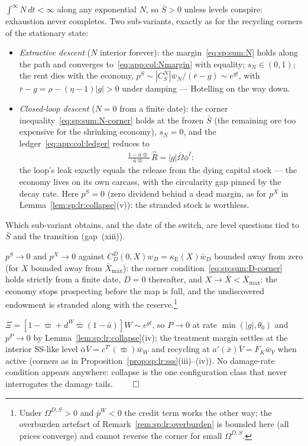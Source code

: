  $\int^\infty N\,dt<\infty$ along any exponential $N$, so
$\bar S>0$ unless levels conspire: exhaustion never completes. Two sub-variants, exactly as
for the recycling corners of the stationary state:
\begin{itemize}
    \item \emph{Extractive descent} ($N$ interior forever): the
    margin~\eqref{eq:sp:sum:N} holds along the path and converges
    to~\eqref{eq:app:col:Nmargin} with equality; $s_N\in\left(0,1\right)$; the rent dies with
    the economy, $p^S\sim\left|C^N_S\right|\bar w_N/\left(\bar r-g\right)\sim e^{gt}$, with
    $\bar r-g=\rho-\left(\eta-1\right)\left|g\right|>0$ under damping --- Hotelling on the way
    down.
    \item \emph{Closed-loop descent} ($N=0$ from a finite date): the corner
    inequality~\eqref{eq:sp:sum:N-corner} holds at the frozen $\bar S$ (the remaining ore too
    expensive for the shrinking economy), $s_N=0$, and the
    ledger~\eqref{eq:app:col:ledger} reduces to
    \begin{align}
    \frac{1-\bar a\bar\varpi}{\bar a\bar\varpi}\,\hat R=\left|g\right|\bar\Omega\phi^I :
    \label{eq:app:col:closedloop}
    \end{align}
    the loop's leak exactly equals the release from the dying capital stock --- the economy
    lives on its own carcass, with the circularity gap pinned by the decay rate. Here
    $p^S=0$ (zero dividend behind a dead margin, as for $p^X$ in
    Lemma~\ref{lem:sp:lr:collapse}(v)): the stranded stock is worthless.
\end{itemize}
Which sub-variant obtains, and the date of the switch, are level questions tied to $\bar S$
and the transition (gap~(xiii)).

 $p^S\to0$ and $p^X\to0$ against
$C^D_D\left(0,X\right)w_D=\kappa_{\mathrm E}\!\left(X\right)\bar w_D$ bounded away from zero
(for $X$ bounded away from $\bar X_{\max}$): the corner
condition~\eqref{eq:sp:sum:D-corner} holds strictly from a finite date, $D=0$ thereafter, and
$X\to\bar X<\bar X_{\max}$: the economy stops prospecting before the map is full, and the
undiscovered endowment is stranded along with the reserve.\footnote{Under $\Omega^{D,S}>0$
and $\bar p^W<0$ the credit term works the other way; the overburden artefact of
Remark~\ref{rem:sp:lr:overburden} is bounded here (all prices converge) and cannot reverse
the corner for small $\Omega^{D,S}$.}

 $\Xi=\left[1-\bar\varpi+d^W\bar\varpi\left(1-\bar a\right)\right]W
\sim e^{gt}$, so $P\to0$ at rate $\min\left(\left|g\right|,\theta_0\right)$ and $p^P\to0$ by
Lemma~\ref{lem:sp:lr:collapse}(iv); the treatment margin settles at the interior
SS-like level $\bar\alpha\bar V=c^{T\prime}\!\left(\bar\varpi\right)\bar w_W$ and recycling
at $a'\!\left(\bar x\right)\bar V=F_K\bar w_Y$ when active
(corners as in Proposition~\ref{prop:sp:lr:sss}(iii)--(iv)). No damage-rate condition
appears anywhere: collapse is the one configuration class that never interrogates the damage
tails. \hfill$\qed$

